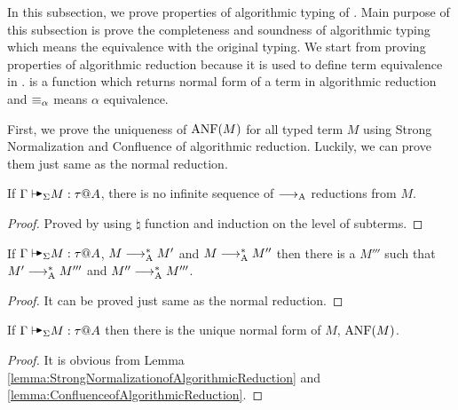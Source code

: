 In this subsection, we prove properties of algorithmic typing of \LMD. Main
purpose of this subsection is prove the completeness and soundness of
algorithmic typing which means the equivalence with the original typing. We
start from proving properties of algorithmic reduction because it is used to
define term equivalence in \QAANF. \ANF is a function which returns normal form
of a term in algorithmic reduction and \( \equiv_\alpha \) means \( \alpha \)
equivalence.

\begin{center}
\end{center}

First, we prove the uniqueness of \( \text{ANF}(M) \) for all typed term \( M \)
using Strong Normalization and Confluence of algorithmic reduction. Luckily, we
can prove them just same as the normal reduction.

\begin{lemma}
    \label{lemma:StrongNormalizationofAlgorithmicReduction}
    If \( \G \AVS M :\tau @ A\), there is no infinite sequence of \( \longrightarrow_{\text{A}} \) reductions from \( M \).
\end{lemma}

\begin{proof}
    Proved by using \( \natural \) function and induction on the level of subterms.
\end{proof}

\begin{lemma}
    \label{lemma:ConfluenceofAlgorithmicReduction}
    If \( \G \AVS M :\tau @ A\), \( M \longrightarrow_{\text{A}}^* M' \) and \(M \longrightarrow_{\text{A}}^* M''\)
    then there is a \( M''' \) such that \( M' \longrightarrow_{\text{A}}^* M''' \) and \( M'' \longrightarrow_{\text{A}}^* M''' \).
\end{lemma}

\begin{proof}
    It can be proved just same as the normal reduction.
\end{proof}

\begin{lemma}
    \label{lemma:UniquenessOfANF}
    If \( \G \AVS M : \tau @ A \) then there is the unique normal form of \( M \), \( \text{ANF}(M) \).
\end{lemma}

\begin{proof}
    It is obvious from Lemma \ref{lemma:StrongNormalizationofAlgorithmicReduction} and \ref{lemma:ConfluenceofAlgorithmicReduction}.
\end{proof}

